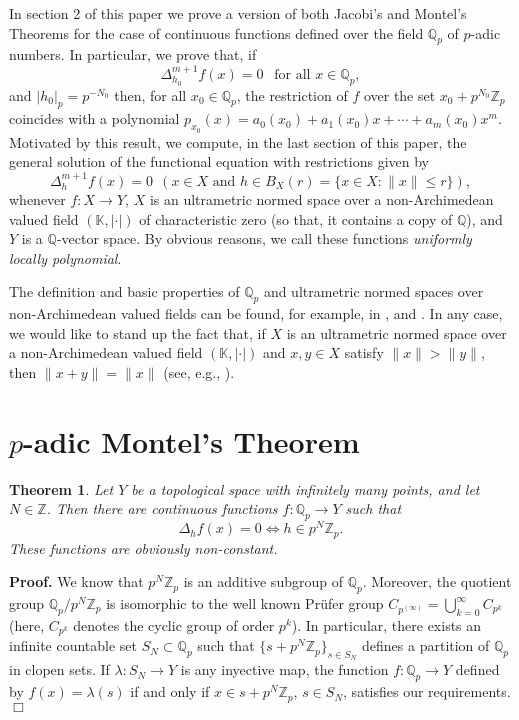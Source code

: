 \documentclass[12pt,a4paper]{amsart}
\newtheorem{theorem}{Theorem}[section]
\theoremstyle{definition}
\begin{document}
In section 2 of this paper we prove a version of both Jacobi's and Montel's Theorems for the case of continuous functions defined over the field $\mathbb{Q}_p$ of $p$-adic numbers. In particular, we prove that, if 
\[
\Delta_{h_0}^{m+1}f(x)=0 \ \ \text{ for all } x\in\mathbb{Q}_p,
\]
and $|h_0|_p=p^{-N_0}$ then,  for all $x_0\in \mathbb{Q}_p$, the restriction of $f$  over the set $x_0+p^{N_0}\mathbb{Z}_p$  coincides with a  polynomial $p_{x_0}(x)=a_0(x_0)+a_1(x_0)x+\cdots+a_m(x_0)x^m$. Motivated by this result, we compute, in the last section of this paper, the general solution of the functional equation with restrictions given by 
\begin{equation}\label{LocPol}
\Delta_h^{m+1}f(x)=0 \ \ (x\in X \text{ and } h\in B_X(r)=\{x\in X:\|x\|\leq r\}),
\end{equation}
whenever $f:X\to Y$, $X$ is an ultrametric normed  space over a non-Archimedean valued field $(\mathbb{K},|\cdot|)$ of characteristic zero (so that, it contains a copy of $\mathbb{Q}$), and $Y$ is a $\mathbb{Q}$-vector space. By obvious reasons, we call these functions \textit{uniformly locally polynomial}. 

The definition and basic properties of $\mathbb{Q}_p$ and ultrametric normed spaces over non-Archimedean valued fields can be found, for example, in \cite{gouvea}, \cite{perez} and \cite{robert}. In any case, we would like to stand up the fact  that, if  $X$ is an ultrametric normed  space over a non-Archimedean valued field $(\mathbb{K},|\cdot|)$ and $x,y\in X$ satisfy $\|x\|>\|y\|$, then $\|x+y\|=\|x\|$ (see, e.g.,  \cite[page 22]{perez}).  

\section{$p$-adic Montel's Theorem}

\begin{theorem}\label{teo1} Let $Y$ be a topological space with infinitely many points, and let $N\in\mathbb{Z}$. Then there are continuous functions $f:\mathbb{Q}_p\to Y$ such that
\[
\Delta_hf(x)=0 \Leftrightarrow h\in p^N\mathbb{Z}_p.
\]
These functions are obviously non-constant.
\end{theorem}
\noindent \textbf{Proof. } We know that   $p^N\mathbb{Z}_p$ is an additive subgroup of $\mathbb{Q}_p$. Moreover, the quotient group $\mathbb{Q}_p/p^N\mathbb{Z}_p$ is isomorphic to the well known Pr\"{u}fer group $C_{p^{(\infty)}}=\bigcup_{k=0}^\infty C_{p^k}$ (here, $C_{p^k}$ denotes the cyclic group of order $p^k$). In particular, there exists an infinite countable set $S_N\subset \mathbb{Q}_p$ such that $\{s+p^N\mathbb{Z}_p\}_{s\in S_N}$ defines a partition of $\mathbb{Q}_p$ in clopen sets. If $\lambda:S_N\to Y$ is any inyective map, the function $f:\mathbb{Q}_p\to Y$ defined by $f(x)=\lambda(s)$ if and only if $x\in s+p^N\mathbb{Z}_p$, $s\in S_N$, satisfies our requirements. {\hfill $\Box$}
\end{document}
